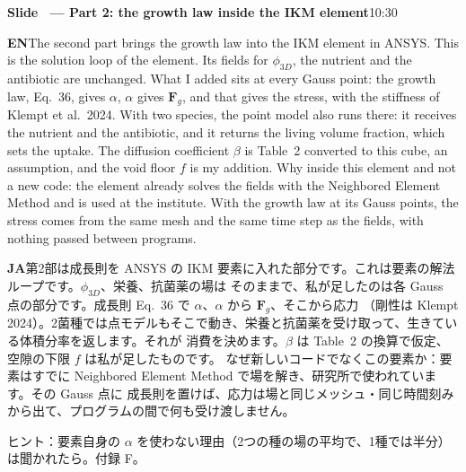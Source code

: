 \documentclass[11pt,a4paper]{article}
\newcounter{sl}
\newcommand{\slide}[2]{\stepcounter{sl}\vspace{8pt}%
  {\color{c3}\large\bfseries Slide \thesl\ --- #1}\hfill{\small #2}\par\vspace{2pt}}
\newcommand{\EN}{\textbf{EN}\quad}
\newcommand{\JA}{\par\textbf{JA}\quad}
\newcommand{\hint}[1]{\par{\color{gray}\small ヒント：#1}}
\begin{document}
\slide{Part 2: the growth law inside the IKM element}{10:30}
\EN The second part brings the growth law into the IKM element in ANSYS. This is the solution loop of the element.
Its fields for $\phi_{3D}$, the nutrient and the antibiotic are unchanged. What I added sits at every Gauss point:
the growth law, Eq.~36, gives $\alpha$, $\alpha$ gives $\mathbf F_g$, and that gives the stress, with the stiffness of
Klempt et al.\ 2024. With two species, the point model also runs there: it receives the nutrient and the antibiotic,
and it returns the living volume fraction, which sets the uptake. The diffusion coefficient $\beta$ is Table~2
converted to this cube, an assumption, and the void floor $f$ is my addition.
Why inside this element and not a new code: the element already solves the fields with the Neighbored Element
Method and is used at the institute. With the growth law at its Gauss points, the stress comes from the same mesh
and the same time step as the fields, with nothing passed between programs.
\JA 第2部は成長則を ANSYS の IKM 要素に入れた部分です。これは要素の解法ループです。$\phi_{3D}$、栄養、抗菌薬の場は
そのままで、私が足したのは各 Gauss 点の部分です。成長則 Eq.~36 で $\alpha$、$\alpha$ から $\mathbf F_g$、そこから応力
（剛性は Klempt 2024）。2菌種では点モデルもそこで動き、栄養と抗菌薬を受け取って、生きている体積分率を返します。それが
消費を決めます。$\beta$ は Table~2 の換算で仮定、空隙の下限 $f$ は私が足したものです。
なぜ新しいコードでなくこの要素か：要素はすでに Neighbored Element Method で場を解き、研究所で使われています。その Gauss 点に
成長則を置けば、応力は場と同じメッシュ・同じ時間刻みから出て、プログラムの間で何も受け渡しません。
\hint{要素自身の $\alpha$ を使わない理由（2つの種の場の平均で、1種では半分）は聞かれたら。付録 F。}
\end{document}
